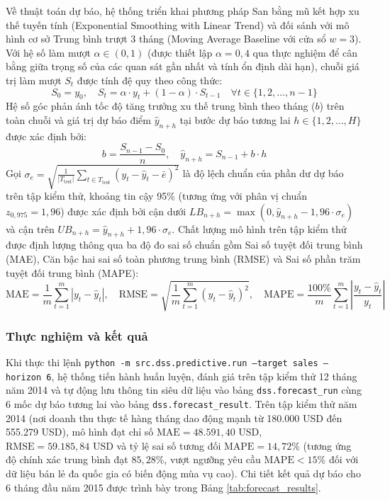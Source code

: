 Về thuật toán dự báo, hệ thống triển khai phương pháp San bằng mũ kết hợp xu thế tuyến tính (Exponential Smoothing with Linear Trend) \cite{hyndman2021} và đối sánh với mô hình cơ sở Trung bình trượt 3 tháng (Moving Average Baseline với cửa sổ $w=3$). Với hệ số làm mượt $\alpha \in (0, 1)$ (được thiết lập $\alpha = 0,4$ qua thực nghiệm để cân bằng giữa trọng số của các quan sát gần nhất và tính ổn định dài hạn), chuỗi giá trị làm mượt $S_t$ được tính đệ quy theo công thức:
\begin{equation}
    S_0 = y_0, \quad S_t = \alpha \cdot y_t + (1 - \alpha) \cdot S_{t-1} \quad \forall t \in \{1, 2, \dots, n-1\}
\end{equation}
Hệ số góc phản ánh tốc độ tăng trưởng xu thế trung bình theo tháng ($b$) trên toàn chuỗi và giá trị dự báo điểm $\hat{y}_{n+h}$ tại bước dự báo tương lai $h \in \{1, 2, \dots, H\}$ được xác định bởi:
\begin{equation}
    b = \frac{S_{n-1} - S_0}{n}, \quad \hat{y}_{n+h} = S_{n-1} + b \cdot h
\end{equation}
Gọi $\sigma_e = \sqrt{\frac{1}{|T_{\text{test}}|}\sum_{t \in T_{\text{test}}} (y_t - \hat{y}_t - \bar{e})^2}$ là độ lệch chuẩn của phần dư dự báo trên tập kiểm thử, khoảng tin cậy 95\% (tương ứng với phân vị chuẩn $z_{0,975} = 1,96$) được xác định bởi cận dưới $LB_{n+h} = \max(0, \hat{y}_{n+h} - 1,96 \cdot \sigma_e)$ và cận trên $UB_{n+h} = \hat{y}_{n+h} + 1,96 \cdot \sigma_e$. Chất lượng mô hình trên tập kiểm thử được định lượng thông qua ba độ đo sai số chuẩn gồm Sai số tuyệt đối trung bình (MAE), Căn bậc hai sai số toàn phương trung bình (RMSE) và Sai số phần trăm tuyệt đối trung bình (MAPE):
\begin{equation}
    \text{MAE} = \frac{1}{m}\sum_{t=1}^{m} |y_t - \hat{y}_t|, \quad
    \text{RMSE} = \sqrt{\frac{1}{m}\sum_{t=1}^{m} (y_t - \hat{y}_t)^2}, \quad
    \text{MAPE} = \frac{100\%}{m}\sum_{t=1}^{m} \left|\frac{y_t - \hat{y}_t}{y_t}\right|
\end{equation}

\subsubsection{Thực nghiệm và kết quả}

Khi thực thi lệnh \texttt{python -m src.dss.predictive.run --target sales --horizon 6}, hệ thống tiến hành huấn luyện, đánh giá trên tập kiểm thử 12 tháng năm 2014 và tự động lưu thông tin siêu dữ liệu vào bảng \texttt{dss.forecast\_run} cùng 6 mốc dự báo tương lai vào bảng \texttt{dss.forecast\_result}. Trên tập kiểm thử năm 2014 (nơi doanh thu thực tế hàng tháng dao động mạnh từ 180.000 USD đến 555.279 USD), mô hình đạt chỉ số $\text{MAE} = 48.591,40\text{ USD}$, $\text{RMSE} = 59.185,84\text{ USD}$ và tỷ lệ sai số tương đối $\text{MAPE} = 14,72\%$ (tương ứng độ chính xác trung bình đạt $85,28\%$, vượt ngưỡng yêu cầu $\text{MAPE} < 15\%$ đối với dữ liệu bán lẻ đa quốc gia có biến động mùa vụ cao). Chi tiết kết quả dự báo cho 6 tháng đầu năm 2015 được trình bày trong Bảng \ref{tab:forecast_results}.

